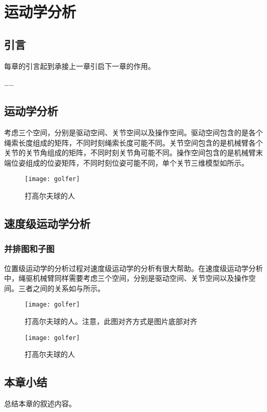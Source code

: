 
\chapter{运动学分析}

\section{引言}

每章的引言起到承接上一章引启下一章的作用。

\ldots\ldots

\section{运动学分析}

考虑三个空间，分别是驱动空间、关节空间以及操作空间。驱动空间包含的是各个绳索长度组成的矩阵，不同时刻绳索长度可能不同。关节空间包含的是机械臂各个关节的关节角组成的矩阵，不同时刻关节角可能不同。操作空间包含的是机械臂末端位姿组成的位姿矩阵，不同时刻位姿可能不同，单个关节三维模型如所示。

\begin{figure}[ht]
\centering
\texttt{[image: golfer]}
\caption{打高尔夫球的人}
\label{fig:bm}
\end{figure}

\section{速度级运动学分析}

\subsection{并排图和子图}

位置级运动学的分析过程对速度级运动学的分析有很大帮助。在速度级运动学分析中，绳驱机械臂同样需要考虑三个空间，分别是驱动空间、关节空间以及操作空间。三者之间的关系如与所示。

\begin{figure}[htbp]
\centering
\begin{minipage}[t]{0.4\textwidth}
\centering
\texttt{[image: golfer]}
\caption{打高尔夫球的人。注意，此图对齐方式是图片底部对齐}
\label{fig:parell1}
\end{minipage}
\centering
\begin{minipage}[t]{0.4\textwidth}
\centering
\texttt{[image: golfer]}
\caption{打高尔夫球的人}
\label{fig:parell2}
\end{minipage}
\end{figure}

\section{本章小结}

总结本章的叙述内容。

\lipsum[1]

